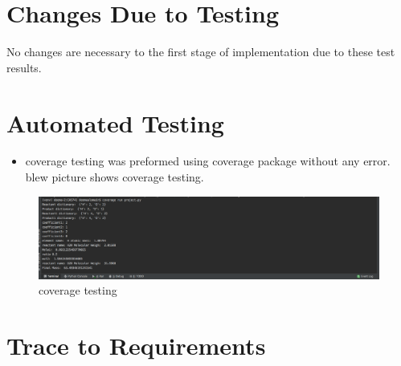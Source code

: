 \documentclass[12pt, titlepage]{article}
\begin{document}
\section{Changes Due to Testing}
No changes are necessary to the first stage of implementation due to these
test results.

\section{Automated Testing}
\begin{itemize} 
\item coverage testing was preformed using coverage package without any error. blew picture shows coverage testing.
\end{itemize}

\begin{figure}[h!]
 \begin{center}
 \includegraphics [width=\textwidth]{coverage}
 \caption{\label{ Figure 23:} coverage testing}
 \end{center}
 \end{figure}

		
\section{Trace to Requirements}\label{functional}
\begin{table}[h!]
\centering
{}
\caption{Traceability Matrix Showing the Connections Between unit test cases and functional requirements}
\label{Table:R_trace}
\end{table}
\end{document}
